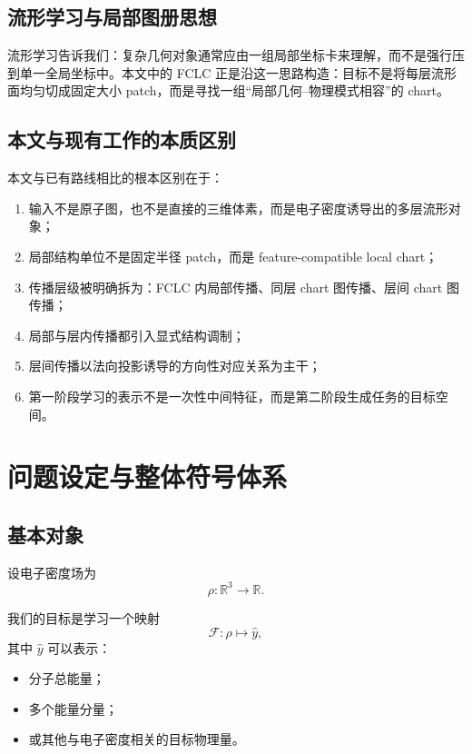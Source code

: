 \documentclass[12pt,a4paper]{ctexart}
\begin{document}
\subsection{流形学习与局部图册思想}
流形学习告诉我们：复杂几何对象通常应由一组局部坐标卡来理解，而不是强行压到单一全局坐标中。本文中的 FCLC 正是沿这一思路构造：目标不是将每层流形面均匀切成固定大小 patch，而是寻找一组“局部几何--物理模式相容”的 chart。

\subsection{本文与现有工作的本质区别}
本文与已有路线相比的根本区别在于：

\begin{enumerate}[leftmargin=2em]
    \item 输入不是原子图，也不是直接的三维体素，而是电子密度诱导出的多层流形对象；
    \item 局部结构单位不是固定半径 patch，而是 feature-compatible local chart；
    \item 传播层级被明确拆为：FCLC 内局部传播、同层 chart 图传播、层间 chart 图传播；
    \item 局部与层内传播都引入显式结构调制；
    \item 层间传播以法向投影诱导的方向性对应关系为主干；
    \item 第一阶段学习的表示不是一次性中间特征，而是第二阶段生成任务的目标空间。
\end{enumerate}

\section{问题设定与整体符号体系}

\subsection{基本对象}

设电子密度场为
\[
\rho:\mathbb R^3\rightarrow \mathbb R.
\]

我们的目标是学习一个映射
\[
\mathcal F:\rho \mapsto \hat y,
\]
其中 \(\hat y\) 可以表示：
\begin{itemize}[leftmargin=2em]
    \item 分子总能量；
    \item 多个能量分量；
    \item 或其他与电子密度相关的目标物理量。
\end{itemize}
\end{document}
